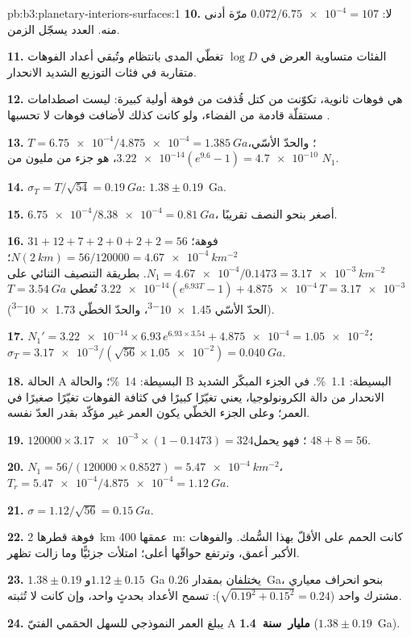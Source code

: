\begin{solution}{pb:b3:planetary-interiors-surfaces:1}
\textbf{10.} لا: $0.072/\num{6.75e-4} = 107$ مرّة أدنى منه. العدد
يسجّل الزمن.

\textbf{11.} الفئات متساوية العرض في $\log D$ تغطّي المدى بانتظام وتُبقي
أعداد الفوهات متقاربة في فئات التوزيع الشديد الانحدار.

\textbf{12.} هي فوهات ثانوية، تكوّنت من كتل قُذفت من فوهة أولية كبيرة:
ليست اصطدامات مستقلّة قادمة من الفضاء، ولو كانت كذلك لأضافت
فوهات لا تحسبها .

\textbf{13.} $T = \num{6.75e-4}/\num{4.875e-4} = \qty{1.385}{Ga}$؛ والحدّ
الأسّي، $\num{3.22e-14}(e^{9.6} - 1) = \num{4.7e-10}$، هو جزء من
مليون من $N_1$.

\textbf{14.} $\sigma_T = T/\sqrt{54} = \qty{0.19}{Ga}$: $1.38 \pm 0.19$~Ga.

\textbf{15.} $\num{6.75e-4}/\num{8.38e-4} = \qty{0.81}{Ga}$، أصغر بنحو
النصف تقريبًا.

\textbf{16.} $31 + 12 + 7 + 2 + 0 + 2 + 2 = 56$ فوهة؛ $N(\qty{2}{km}) =
56/120000 = \qty{4.67e-4}{km^{-2}}$؛ $N_1 = \num{4.67e-4}/0.1473 =
\qty{3.17e-3}{km^{-2}}$. بطريقة التنصيف الثنائي على $\num{3.22e-14}(e^{6.93T} - 1) +
\num{4.875e-4}\,T = \num{3.17e-3}$ تُعطي $T = \qty{3.54}{Ga}$ (الحدّ الأسّي
\num{1.45e-3}، والحدّ الخطّي \num{1.73e-3}).

\textbf{17.} $N_1' = \num{3.22e-14}\times6.93\,e^{6.93\times3.54} +
\num{4.875e-4} = \num{1.05e-2}$؛ $\sigma_T = \num{3.17e-3}/(\sqrt{56}\times
\num{1.05e-2}) = \qty{0.040}{Ga}$.

\textbf{18.} الحالة A البسيطة: \qty{14}{\percent}؛ والحالة B البسيطة: \qty{1.1}{\percent}. في
الجزء المبكّر الشديد الانحدار من دالة الكرونولوجيا، يعني تغيّرًا كبيرًا في كثافة الفوهات
تغيّرًا صغيرًا في العمر؛ وعلى الجزء الخطّي يكون العمر غير مؤكّد بقدر
العدّ نفسه.

\textbf{19.} $120000\times\num{3.17e-3}\times(1 - 0.1473) = 324$؛ فهو
يحمل $48 + 8 = 56$.

\textbf{20.} $N_1 = 56/(120000\times0.8527) = \qty{5.47e-4}{km^{-2}}$،
$T_r = \num{5.47e-4}/\num{4.875e-4} = \qty{1.12}{Ga}$.

\textbf{21.} $\sigma = 1.12/\sqrt{56} = \qty{0.15}{Ga}$.

\textbf{22.} فوهة قطرها \qty{2}{km} عمقها \qty{400}{m}: كانت الحمم على
الأقلّ بهذا السُّمك. والفوهات الأكبر أعمق، وترتفع حوافّها أعلى؛
امتلأت جزئيًّا وما زالت تظهر.

\textbf{23.} $1.38 \pm 0.19$ و$1.12 \pm 0.15$~Ga يختلفان بمقدار \qty{0.26}{Ga}،
بنحو انحراف معياري مشترك واحد ($\sqrt{0.19^2 + 0.15^2} = 0.24$):
تسمح الأعداد بحدثٍ واحد، وإن كانت لا تُثبته.

\textbf{24.} يبلغ العمر النموذجي للسهل الحمَمي الفتيّ A
\textbf{1.4~مليار~سنة} ($1.38 \pm 0.19$~Ga).
\end{solution}
